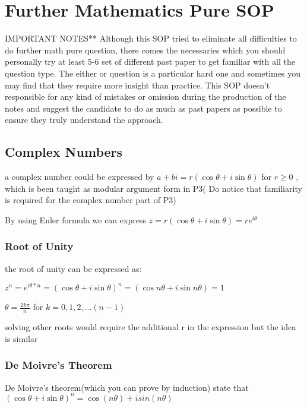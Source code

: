 \documentclass[]{article}
\date{}
\begin{document}
\section{Further Mathematics Pure SOP}\label{header-n0}

IMPORTANT NOTES** Although this SOP tried to eliminate all difficulties
to do further math pure question, there comes the necessaries which you
should personally try at least 5-6 set of different past paper to get
familiar with all the question type. The either or question is a
particular hard one and sometimes you may find that they require more
insight than practice. This SOP doesn't responsible for any kind of
mistakes or omission during the production of the notes and suggest the
candidate to do as much as past papers as possible to ensure they truly
understand the approach.

\subsection{Complex Numbers}\label{header-n3}

a complex number could be expressed by
\(a +bi = r(\cos\theta + i\sin\theta)\) for \(r \geq 0\) , which is been
taught as modular argument form in P3( Do notice that familiarity is
required for the complex number part of P3)

By using Euler formula we can express
\(z = r(\cos\theta + i\sin \theta) = re^{i\theta}\)

\subsubsection{Root of Unity}\label{header-n6}

the root of unity can be expressed as:

\(z^n =e^{i\theta*n} =(\cos\theta + i\sin\theta)^n = (\cos n\theta + i\sin n\theta)= 1\)

\(\theta = \frac{2k\pi}{n}\) for \( k=0,1,2,...(n-1)\)

solving other roots would require the additional r in the expression but
the idea is similar

\subsubsection{De Moivre's Theorem}\label{header-n11}

De Moivre's theorem(which you can prove by induction) state that
\((\cos\theta + i\sin\theta)^n = \cos(n\theta) + isin(n\theta)\)
\end{document}
